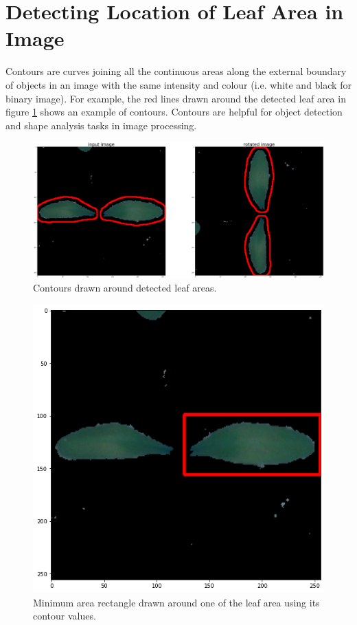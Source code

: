 \section{Detecting Location of Leaf Area in Image}\label{leaf_location}
Contours are curves joining all the continuous areas along the external boundary of objects in an image with the same intensity and colour (i.e. white and black for binary image). For example, the red lines drawn around the detected leaf area in figure \ref{fig:my_cont_rota} shows an example of contours. Contours are helpful for object detection and shape analysis tasks in image processing.
\begin{figure}[!htb]
    \centering
    \includegraphics[scale=0.15, keepaspectratio]{Figures/contour.png}
    \caption{Contours drawn around detected leaf areas.}
    \label{fig:my_cont_rota}
\end{figure} 
\begin{figure}[!htb]
    \centering
    \includegraphics[scale=0.45, keepaspectratio]{Figures/min_rect.png}
    \caption{Minimum area rectangle drawn around one of the leaf area using its contour values.}
    \label{fig:my_min_rect}
\end{figure} 

